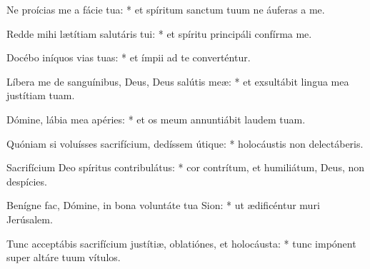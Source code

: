 Ne proícias me a fácie tua: * et spíritum sanctum tuum ne áuferas a me.

Redde mihi lætítiam salutáris tui: * et spíritu principáli confírma me.

Docébo iníquos vias tuas: * et ímpii ad te converténtur.

Líbera me de sanguínibus, Deus, Deus salútis meæ: * et exsultábit lingua mea justítiam tuam.

Dómine, lábia mea apéries: * et os meum annuntiábit laudem tuam.

Quóniam si voluísses sacrifícium, dedíssem útique: * holocáustis non delectáberis.

Sacrifícium Deo spíritus contribulátus: * cor contrítum, et humiliátum, Deus, non despícies.

Benígne fac, Dómine, in bona voluntáte tua Sion: * ut ædificéntur muri Jerúsalem.

Tunc acceptábis sacrifícium justítiæ, oblatiónes, et holocáusta: * tunc impónent super altáre tuum vítulos.

\respice
